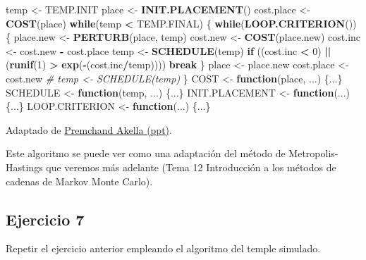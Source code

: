 \documentclass[]{book}
\newenvironment{Shaded}{\begin{snugshade}}{\end{snugshade}}
\newcommand{\KeywordTok}[1]{\textcolor[rgb]{0.13,0.29,0.53}{\textbf{#1}}}
\newcommand{\DecValTok}[1]{\textcolor[rgb]{0.00,0.00,0.81}{#1}}
\newcommand{\StringTok}[1]{\textcolor[rgb]{0.31,0.60,0.02}{#1}}
\newcommand{\CommentTok}[1]{\textcolor[rgb]{0.56,0.35,0.01}{\textit{#1}}}
\newcommand{\ControlFlowTok}[1]{\textcolor[rgb]{0.13,0.29,0.53}{\textbf{#1}}}
\newcommand{\OperatorTok}[1]{\textcolor[rgb]{0.81,0.36,0.00}{\textbf{#1}}}
\newcommand{\NormalTok}[1]{#1}
\theoremstyle{definition}
\theoremstyle{definition}
\theoremstyle{definition}
\theoremstyle{remark}
\begin{document}
\begin{Shaded}
\begin{Highlighting}[]
\NormalTok{temp <-}\StringTok{ }\NormalTok{TEMP.INIT}
\NormalTok{place <-}\StringTok{ }\KeywordTok{INIT.PLACEMENT}\NormalTok{()}
\NormalTok{cost.place <-}\StringTok{ }\KeywordTok{COST}\NormalTok{(place)}
\ControlFlowTok{while}\NormalTok{(temp }\OperatorTok{<}\StringTok{ }\NormalTok{TEMP.FINAL) \{}
  \ControlFlowTok{while}\NormalTok{(}\KeywordTok{LOOP.CRITERION}\NormalTok{()) \{}
\NormalTok{    place.new <-}\StringTok{ }\KeywordTok{PERTURB}\NormalTok{(place, temp)}
\NormalTok{    cost.new <-}\StringTok{ }\KeywordTok{COST}\NormalTok{(place.new)}
\NormalTok{    cost.inc <-}\StringTok{ }\NormalTok{cost.new }\OperatorTok{-}\StringTok{ }\NormalTok{cost.place}
\NormalTok{    temp <-}\StringTok{ }\KeywordTok{SCHEDULE}\NormalTok{(temp)}
    \ControlFlowTok{if}\NormalTok{ ((cost.inc }\OperatorTok{<}\StringTok{ }\DecValTok{0}\NormalTok{) }\OperatorTok{||}\StringTok{ }\NormalTok{(}\KeywordTok{runif}\NormalTok{(}\DecValTok{1}\NormalTok{) }\OperatorTok{>}\StringTok{ }\KeywordTok{exp}\NormalTok{(}\OperatorTok{-}\NormalTok{(cost.inc}\OperatorTok{/}\NormalTok{temp)))) }\ControlFlowTok{break}
\NormalTok{  \}}
\NormalTok{  place <-}\StringTok{ }\NormalTok{place.new}
\NormalTok{  cost.place <-}\StringTok{ }\NormalTok{cost.new}
  \CommentTok{# temp <- SCHEDULE(temp)}
\NormalTok{\}}
\NormalTok{COST <-}\StringTok{ }\ControlFlowTok{function}\NormalTok{(place, ...) \{...\}}
\NormalTok{SCHEDULE <-}\StringTok{ }\ControlFlowTok{function}\NormalTok{(temp, ...) \{...\}}
\NormalTok{INIT.PLACEMENT <-}\StringTok{ }\ControlFlowTok{function}\NormalTok{(...) \{...\}}
\NormalTok{LOOP.CRITERION <-}\StringTok{ }\ControlFlowTok{function}\NormalTok{(...) \{...\}}
\end{Highlighting}
\end{Shaded}

Adaptado de
\href{http://www.ecs.umass.edu/ece/labs/vlsicad/ece665/slides/SimulatedAnnealing.ppt}{Premchand
Akella (ppt)}.

Este algoritmo se puede ver como una adaptación del método de
Metropolis-Hastings que veremos más adelante (Tema 12 Introducción a los
métodos de cadenas de Markov Monte Carlo).

\subsection{Ejercicio 7}\label{ejercicio-7}

Repetir el ejercicio anterior empleando el algoritmo del temple
simulado.
\end{document}
